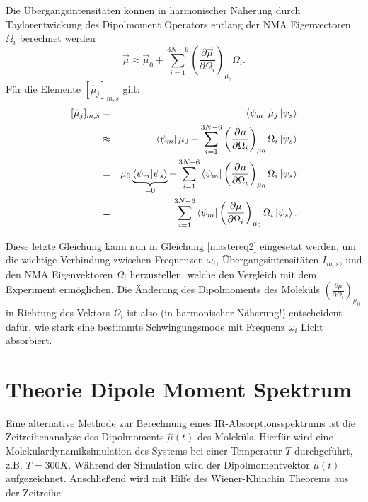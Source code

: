 \documentclass[a4paper,12pt]{article}
\begin{document}
Die Übergangsintensitäten können in harmonischer Näherung durch Taylorentwickung des Dipolmoment Operators entlang der NMA Eigenvectoren $\Omega_i$ berechnet werden
\begin{equation}\label{mutaylor}
 \vec{\mu} \approx  \vec{\mu}_0 + \sum_{i=1}^{3N-6} \left(\frac{\partial \vec{\mu}}{\partial \Omega_i}\right)_{\mu_0} \Omega_i.
\end{equation}
Für die Elemente $[\hat{\mu}_j]_{m,s}$ gilt:
\begin{eqnarray}\label{maximu}
  [\hat{\mu}_j]_{m,s}&=&\bra{\psi_m}\hat{\mu}_j \ket{\psi_s} \nonumber \\
                     &\approx&\bra{\psi_m} \mu_0 + \sum_{i=1}^{3N-6} \left(\frac{\partial \mu}{\partial \Omega_i}\right)_{\mu_0} \Omega_i \ket{\psi_s} \nonumber\\
                     &=&\mu_0 \underbrace{\braket{\psi_m|\psi_s}}_{=0} + \sum_{i=1}^{3N-6} \bra{\psi_m}  \left(\frac{\partial \mu}{\partial \Omega_i}\right)_{\mu_0} \Omega_i \ket{\psi_s} \nonumber\\
                     &=&\sum_{i=1}^{3N-6} \bra{\psi_m}  \left(\frac{\partial \mu}{\partial \Omega_i}\right)_{\mu_0} \Omega_i \ket{\psi_s}.
\end{eqnarray}

Diese letzte Gleichung kann nun in Gleichung \ref{mastereq2} eingesetzt werden, um die wichtige Verbindung zwischen Frequenzen $\omega_i$, Übergangsintensitäten $I_{m,s}$, und den NMA
Eigenvektoren $\Omega_i$ herzustellen, welche den Vergleich mit dem Experiment ermöglichen.
Die Änderung des Dipolmoments des Moleküls $\left(\frac{\partial \mu}{\partial \Omega_i}\right)_{\mu_0}$ in Richtung des Vektors $\Omega_i$ ist also (in harmonischer Näherung!) 
entscheident dafür, wie stark eine bestimmte Schwingungsmode mit Frequenz $\omega_i$ Licht absorbiert.

\section{Theorie Dipole Moment Spektrum}
Eine alternative Methode zur Berechnung eines IR-Absorptionsspektrums ist die Zeitreihenanalyse des Dipolmoments $\hat{\mu}(t)$ des Moleküls. Hierfür wird eine Molekulardynamiksimulation
des Systems bei einer Temperatur $T$ durchgeführt, z.B. $T=300K$. Während der Simulation wird der Dipolmomentvektor $\hat{\mu}(t)$ aufgezeichnet. Anschließend wird mit Hilfe des
Wiener-Khinchin Theorems aus der Zeitreihe 
\end{document}
